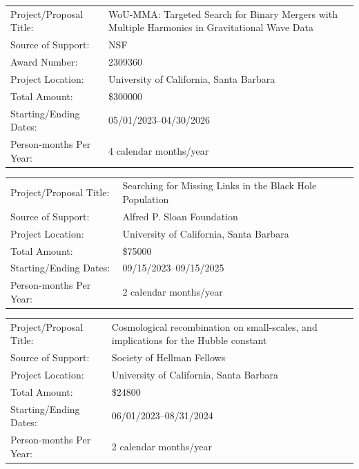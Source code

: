 \documentclass{article}
\newlength{\cvindent}
\newlength{\cvtablewidth}
\newcommand{\cvtableindent}{\noindent\hspace*{\cvindent}}
\newcommand{\cvtablesep}{\vspace{4pt}}
\begin{document}
\cvtablesep

\cvtableindent\begin{tabular}{|p{0.3\cvtablewidth} p{0.62\cvtablewidth}|}
\hline
Project/Proposal Title:	& WoU-MMA: Targeted Search for Binary Mergers with Multiple Harmonics in Gravitational Wave Data\\
Source of Support: 	& NSF\\
Award Number:       & 2309360\\
Project Location: 	& University of California, Santa Barbara\\
Total Amount: & \$300000\\
Starting/Ending Dates: 	& 05/01/2023--04/30/2026\\
Person-months Per Year: & 4 calendar months/year\\
\hline
\end{tabular} 

\cvtablesep

\cvtableindent\begin{tabular}{|p{0.3\cvtablewidth} p{0.62\cvtablewidth}|}
\hline
Project/Proposal Title:	& Searching for Missing Links in the Black Hole Population\\
Source of Support: 	& Alfred P. Sloan Foundation\\
Project Location: 	& University of California, Santa Barbara\\
Total Amount: & \$75000\\
Starting/Ending Dates: 	& 09/15/2023--09/15/2025\\
Person-months Per Year: & 2 calendar months/year\\
\hline
\end{tabular}

\cvtablesep

\cvtableindent\begin{tabular}{|p{0.3\cvtablewidth} p{0.62\cvtablewidth}|}
\hline
Project/Proposal Title:	& Cosmological recombination on small-scales, and implications for the Hubble constant\\
Source of Support: 	& Society of Hellman Fellows\\
Project Location: 	& University of California, Santa Barbara\\
Total Amount: & \$24800\\
Starting/Ending Dates: 	& 06/01/2023--08/31/2024\\
Person-months Per Year: & 2 calendar months/year\\
\hline
\end{tabular}
\end{document}
